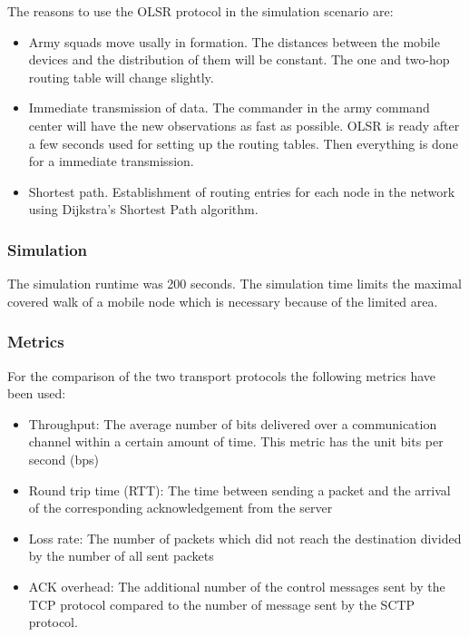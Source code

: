 \documentclass[a4paper]{article}
\begin{document}
The reasons to use the OLSR protocol in the simulation scenario are:
\begin{itemize}
	\item Army squads move usally in formation. The distances between the mobile devices and the distribution of them will be constant. The one and two-hop routing table will change slightly.
	\item Immediate transmission of data. The commander in the army command center will have the new observations as fast as possible. OLSR is ready after a few seconds used for setting up the routing tables. Then everything is done for a immediate transmission.
	\item Shortest path. Establishment of routing entries for each node in the network using Dijkstra's Shortest Path algorithm.
\end{itemize}


\subsubsection{Simulation}
The simulation runtime was 200 seconds. The simulation time limits the maximal covered walk of a mobile node which is necessary because of the limited area.
\subsubsection{Metrics}
For the comparison of the two transport protocols the following metrics have been used:
\begin{itemize}
	\item Throughput: The average number of bits delivered over a communication channel within a certain amount of time. This metric has the unit bits per second (bps)
	\item Round trip time (RTT): The time between sending a packet and the arrival of the corresponding acknowledgement from the server
	\item Loss rate: The number of packets which did not reach the destination divided by the number of all sent packets
	\item ACK overhead: The additional number of the control messages sent by the TCP protocol compared to the number of message sent by the SCTP protocol.
\end{itemize}			
\end{document}
